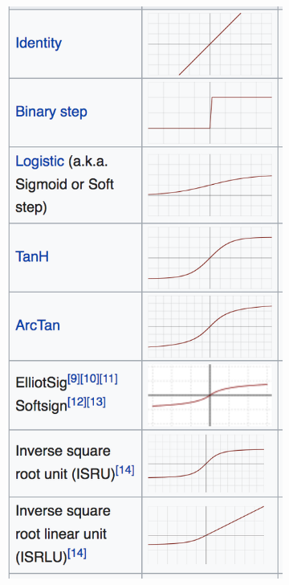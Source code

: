 \documentclass[10pt,mathserif]{beamer}
\begin{document}
\begin{frame}
\begin{figure}[ht]
\begin{subfigure}{0.16\paperwidth}
      \includegraphics[width=0.16\paperwidth]{figure/activation_examples_1}
    \end{subfigure}
    \begin{subfigure}{.16\paperwidth}

\end{subfigure}
\end{figure}
\end{frame}
\end{document}
